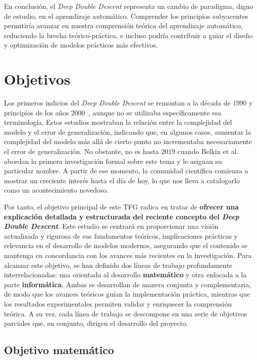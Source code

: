 En conclusión, el \emph{Deep Double Descent} representa un cambio de paradigma, digno de estudio, en el aprendizaje automático. Comprender los principios subyacentes permitiría avanzar en nuestra comprensión teórica del aprendizaje automático, reduciendo la brecha teórico-práctica, e incluso podría contribuir a guiar el diseño y optimización de modelos prácticos más efectivos.

\section{Objetivos}

Los primeros indicios del \textit{Deep Double Descent} se remontan a la década de $1990$ y principios de los años $2000$~\cite{Vallet1989, Opper2001}, aunque no se utilizaba específicamente esa terminología. Estos estudios mostraban la relación entre la complejidad del modelo y el error de generalización, indicando que, en algunos casos, aumentar la complejidad del modelo más allá de cierto punto no incrementaba necesariamente el error de generalización. No obstante, no es hasta $2019$ cuando Belkin et al.~\cite{Belkin2019} abordan la primera investigación formal sobre este tema y le asignan su particular nombre. A partir de ese momento, la comunidad científica comienza a mostrar un creciente interés hasta el día de hoy, lo que nos lleva a catalogarlo como un acontecimiento novedoso.

Por tanto, el objetivo principal de este TFG radica en tratar de \textbf{ofrecer una explicación detallada y estructurada del reciente concepto del \emph{Deep Double Descent}}. Este estudio se centrará en proporcionar una visión actualizada y rigurosa de sus fundamentos teóricos, implicaciones prácticas y relevancia en el desarrollo de modelos modernos, asegurando que el contenido se mantenga en concordancia con los avances más recientes en la investigación. Para alcanzar este objetivo, se han definido dos líneas de trabajo profundamente interrelacionadas: una orientada al desarrollo \textbf{matemático} y otra enfocada a la parte \textbf{informática}. Ambas se desarrollan de manera conjunta y complementaria, de modo que los avances teóricos guían la implementación práctica, mientras que los resultados experimentales permiten validar y enriquecer la comprensión teórica. A su vez, cada línea de trabajo se descompone en una serie de objetivos parciales que, en conjunto, dirigen el desarrollo del proyecto.

\subsection{Objetivo matemático}

